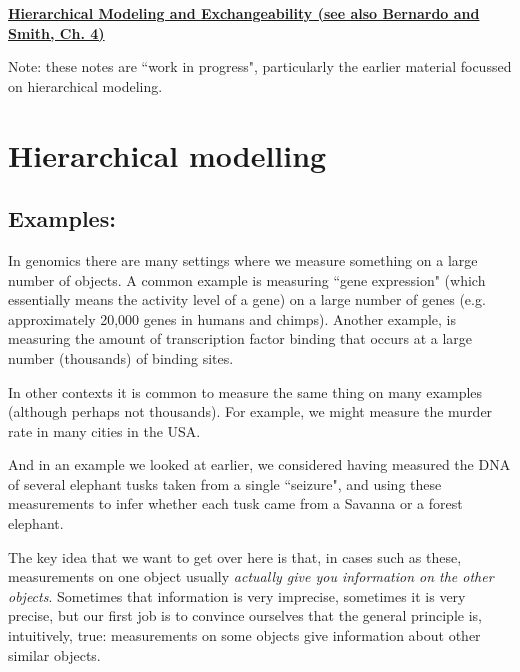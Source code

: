 \documentclass{article}
\begin{document}
\normalsize
\underline{\Large{\bf Hierarchical Modeling and Exchangeability (see also Bernardo and Smith, Ch. 4)}}

Note: these notes are ``work in progress", particularly the earlier
material focussed on hierarchical modeling.

\vskip 7mm

\section{Hierarchical modelling}

\subsection{Examples:}

In genomics there are many settings where we measure something
on a large number
of objects. A common example is measuring ``gene expression" (which
essentially means the activity level of a gene) on
a large number of genes (e.g. approximately 20,000 genes in humans and chimps). Another example, is measuring the amount of transcription factor binding that occurs at a large number (thousands) of binding sites. 

In other contexts it is common to measure the same thing on
many examples (although perhaps not thousands). For example, we might measure the murder rate
in many cities in the USA.

And in an example we looked at earlier, we considered having measured
the DNA of several elephant tusks taken from a single ``seizure", and using
these  measurements to infer whether each tusk came from a Savanna
or a forest elephant.

The key idea that we want to get over here is that, in cases such as these,
measurements on one object usually {\it actually give you information on the other objects}. Sometimes that information is very imprecise, sometimes it is very precise, but our first job is to convince ourselves that the general principle is, intuitively, true:  measurements on some objects give information about
other similar objects.
\end{document}

